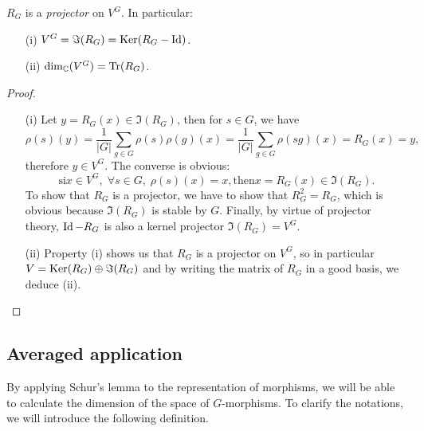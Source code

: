  
\begin{thm}
\label{thm-pte-operator-reynolds}
  $ R_G $ is a \textit{projector} on $ V^G $. In particular: \begin{itemize}
\item [{\upshape (i)}] $ V^G = \Im (R_G) = \operatorname{Ker} (R_G - \operatorname{Id}) $.
\item [{\upshape (ii)}]  \label{notation-87} $ \dim_{\mathbb{C}} (V^G) = \operatorname{Tr} (R_G) $.
\end{itemize}
\end{thm}
\begin{proof}
\begin{itemize}
\item [{\upshape (i)}] Let $ y = R_G (x) \in \Im (R_G) $, then for $ s \in G $, we have
\begin{equation*}
\rho (s) (y) = \frac{1}{|G|} \sum_{g \in G}{\rho (s) \rho (g) (x)} = \frac{1}{|G|} \sum_{g \in G}{\rho (sg) (x)} = R_G (x) = y,
\end{equation*}
therefore $ y \in V^G $. The converse is obvious:
\begin{equation*}
\text{si} x \in V^G, \; \forall s \in G, \; \rho (s) (x) = x, \text{then} x = R_G (x) \in \Im (R_G).
\end{equation*}
To show that $ R_G $ is a projector, we have to show that $ R_G^2 = R_G $, which is obvious because $ \Im (R_G) $ is stable by $G$. Finally, by virtue of projector theory, $ \operatorname{Id} - R_G $ is also a kernel projector $ \Im (R_G) = V^G $.
\item [{\upshape (ii)}] Property (i) shows us that $ R_G $ is a projector on $ V^G $, so in particular $ V = \operatorname{Ker} (R_G) \oplus \Im (R_G) $ and by writing the matrix of $ R_G $ in a good basis, we deduce (ii).
\end{itemize}
\end{proof}
 
\subsection{Averaged application}
\label{sect2-application-average}
 
By applying Schur's lemma to the representation of morphisms, we will be able to calculate the dimension of the space of $G$-morphisms. To clarify the notations, we will introduce the following definition. 
 
